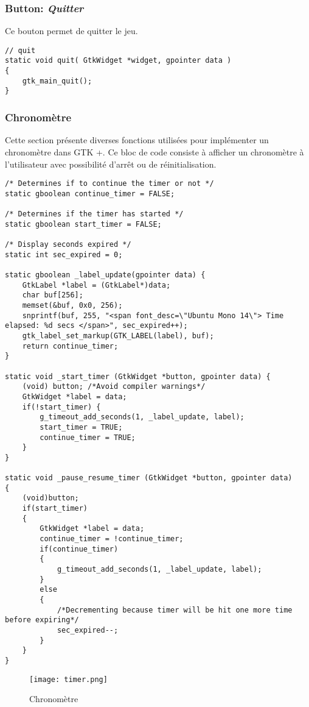 \documentclass{article}
\begin{document}
\subsubsection{Button: \textit{Quitter}}
Ce bouton permet de quitter le jeu.
\begin{lstlisting}[style=CStyle]
// quit
static void quit( GtkWidget *widget, gpointer data )
{
  	gtk_main_quit();
}
\end{lstlisting}

\subsubsection{Chronomètre}
Cette section présente diverses fonctions utilisées pour implémenter un chronomètre dans GTK +. Ce bloc de code consiste à afficher un chronomètre à l'utilisateur avec possibilité d'arrêt ou de réinitialisation.

\begin{lstlisting}[style=CStyle]
/* Determines if to continue the timer or not */
static gboolean continue_timer = FALSE;

/* Determines if the timer has started */
static gboolean start_timer = FALSE;

/* Display seconds expired */
static int sec_expired = 0;

static gboolean _label_update(gpointer data) {
	GtkLabel *label = (GtkLabel*)data;
	char buf[256];
	memset(&buf, 0x0, 256);
	snprintf(buf, 255, "<span font_desc=\"Ubuntu Mono 14\"> Time elapsed: %d secs </span>", sec_expired++);
	gtk_label_set_markup(GTK_LABEL(label), buf);
	return continue_timer;
}

static void _start_timer (GtkWidget *button, gpointer data) {
    (void) button; /*Avoid compiler warnings*/
    GtkWidget *label = data;
    if(!start_timer) {
        g_timeout_add_seconds(1, _label_update, label);
        start_timer = TRUE;
        continue_timer = TRUE;
    }
}

static void _pause_resume_timer (GtkWidget *button, gpointer data)
{
    (void)button;
    if(start_timer)
    {
        GtkWidget *label = data;
        continue_timer = !continue_timer;
        if(continue_timer)
        {
            g_timeout_add_seconds(1, _label_update, label);
        }
        else
        {
            /*Decrementing because timer will be hit one more time before expiring*/
            sec_expired--;
        }
    }
}
\end{lstlisting}

\begin{figure}[h!]
\centering
\texttt{[image: timer.png]}
\caption{Chronomètre}
\label{fig:timer}
\end{figure}
\end{document}
